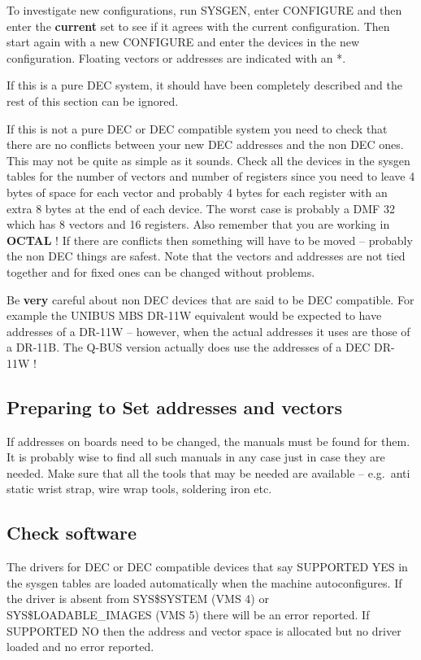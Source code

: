 To investigate new configurations, run SYSGEN, enter CONFIGURE and 
then enter the {\bf current} set to see if it agrees with the current
configuration.
Then start again with a new CONFIGURE and enter the devices in the new
configuration.
Floating vectors or addresses are indicated with an *.

If this is a pure DEC system, it should have been completely described
and the rest of this section can be ignored.

If this is not a pure DEC or DEC compatible system you need to 
check that there are no conflicts between your new DEC addresses and the 
non DEC ones.
This may not be quite as simple as it sounds.
Check all the devices in the sysgen tables for the number of vectors and
number of registers since you need to leave 4 bytes of space for each
vector and probably 4 bytes for each register with an extra 8 bytes at
the end of each device.
The worst case is probably a DMF 32 which has 8 vectors and 16
registers.
Also remember that you are working in {\bf OCTAL} !
If there are conflicts then  something will have to be moved -- probably
the non DEC things are safest.
Note that the vectors and addresses are not tied
together and for fixed ones  can be changed without problems. 

Be {\bf very} careful about non DEC devices that are said to be 
DEC compatible.
For example the UNIBUS MBS DR-11W equivalent would be
expected  to have addresses of a DR-11W -- however, when the actual
addresses it uses are those of a DR-11B.
The Q-BUS version actually does use the addresses of a DEC DR-11W !


\subsection{Preparing to Set addresses and vectors}

If addresses on boards need to be changed, the manuals must be found for them. 
It is probably wise to find all such manuals in any case just in
 case they are needed. Make sure that all the tools that may be needed
are available -- e.g.\  anti static wrist strap, wire wrap tools, soldering
iron etc. 

\subsection{Check software}

The drivers for DEC or DEC compatible devices that say SUPPORTED YES
 in the sysgen tables are loaded automatically when the machine autoconfigures.
 If the driver is absent from SYS\$SYSTEM (VMS 4) or SYS\$LOADABLE\_IMAGES 
(VMS 5) there will be an error reported.
 If SUPPORTED  NO then
 the address and vector space is allocated but no driver loaded and no error
 reported.

